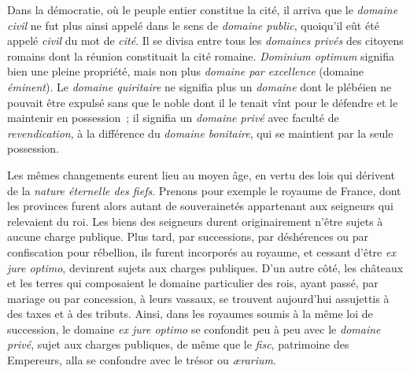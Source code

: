 \documentclass[french,twoside]{book} %
\begin{document}
Dans la démocratie, où le peuple entier constitue la cité, il arriva que le {\itshape domaine civil} ne fut plus ainsi appelé dans le sens de {\itshape domaine public}, quoiqu’il eût été appelé {\itshape civil} du mot de {\itshape cité}. Il se divisa entre tous les {\itshape domaines privés} des citoyens  romains dont la réunion constituait la cité romaine. {\itshape Dominium optimum} signifia bien une pleine propriété, mais non plus {\itshape domaine par excellence} (domaine {\itshape éminent}). Le {\itshape domaine quiritaire} ne signifia plus un {\itshape domaine} dont le plébéien ne pouvait être expulsé sans que le noble dont il le tenait vînt pour le défendre et le maintenir en possession ; il signifia un {\itshape domaine privé} avec faculté de {\itshape revendication}, à la différence du {\itshape domaine bonitaire}, qui se maintient par la seule possession.\par
Les mêmes changements eurent lieu au moyen âge, en vertu des lois qui dérivent de la {\itshape nature éternelle des fiefs}. Prenons pour exemple le royaume de France, dont les provinces furent alors autant de souverainetés appartenant aux seigneurs qui relevaient du roi. Les biens des seigneurs durent originairement n’être sujets à aucune charge publique. Plus tard, par successions, par déshérences ou par confiscation pour rébellion, ils furent incorporés au royaume, et cessant d’être {\itshape ex jure optimo}, devinrent sujets aux charges publiques. D’un autre côté, les châteaux et les terres qui composaient le domaine particulier des rois, ayant passé, par mariage ou par concession, à leurs vassaux, se trouvent aujourd’hui assujettis à des taxes et à des tributs. Ainsi, dans les royaumes soumis à la même loi de succession, le domaine {\itshape ex jure optimo} se confondit peu à peu avec le {\itshape domaine privé}, sujet aux charges publiques, de même que le {\itshape fisc}, patrimoine des Empereurs, alla se confondre avec le trésor ou {\itshape ærarium}.
\end{document}
